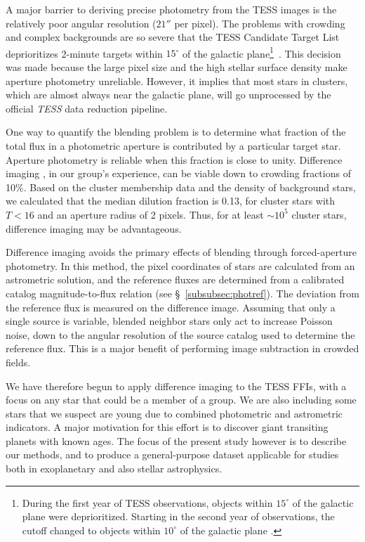 \documentclass[12pt,twocolumn,tighten]{aastex62}
\begin{document}
A major barrier to deriving precise photometry from the TESS images is
the relatively poor angular resolution ($21''$ per pixel).   The
problems with crowding and complex backgrounds are so severe that the
TESS Candidate Target List deprioritizes 2-minute targets within
$15^\circ$ of the galactic plane\footnote{During the first year of
TESS observations, objects within $15^\circ$ of the galactic plane
were deprioritized. Starting in the second year of observations, the
cutoff changed to objects within $10^\circ$ of the galactic plane
\citep{stassun_TIC8_2019}.}~\citep{stassun_TIC_2018,stassun_TIC8_2019}.
This decision was made because the large pixel size and the high
stellar surface density make aperture photometry unreliable.  However,
it implies that most stars in clusters, which are almost always near
the galactic plane, will go unprocessed by the official {\it TESS}
data reduction pipeline.

One way to quantify the blending problem is to determine what fraction
of the total flux in a photometric aperture is contributed by a
particular target star. Aperture photometry is reliable when this
fraction is close to unity.  Difference imaging
\citep{Alard_Lupton_1998,miller_optimal_2008}, in our group's
experience, can be viable down to crowding fractions of 10\%.  Based
on the \citet{Kharchenko_et_al_2013} cluster membership data and the
density of background stars, we calculated that the median dilution
fraction is 0.13, for cluster stars with $T< 16$ and an aperture
radius of 2 pixels.  Thus, for at least $\sim$$10^5$ cluster stars,
difference imaging may be advantageous.

Difference imaging avoids the primary effects of blending through
forced-aperture photometry.  In this method, the pixel coordinates of
stars are calculated from an astrometric solution, and the reference
fluxes are determined from a calibrated catalog magnitude-to-flux
relation (see \S~\ref{subsubsec:photref}).  The deviation from the
reference flux is measured on the difference image.  Assuming that
only a single source is variable, blended neighbor stars only act to
increase Poisson noise, down to the angular resolution of the source
catalog used to determine the reference flux.  This is a major benefit
of performing image subtraction in crowded fields.

We have therefore begun to apply difference imaging to the TESS
FFIs, with a focus on any star that could be a member of a group.
We are also including some stars that we suspect are young due to
combined photometric and astrometric indicators.  A major motivation
for this effort is to discover giant transiting planets with known
ages.  The focus of the present study however is to describe our
methods, and to produce a general-purpose dataset applicable for
studies both in exoplanetary and also stellar astrophysics.
\end{document}
